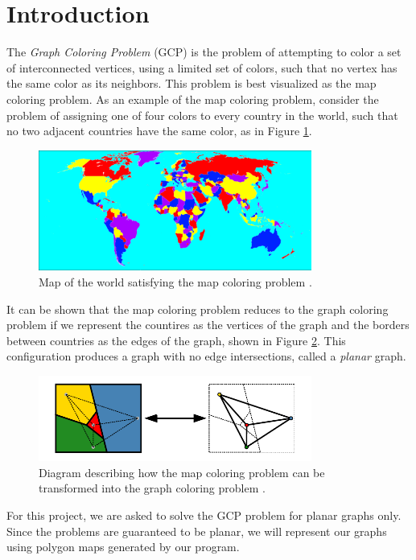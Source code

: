 \documentclass{article}
\begin{document}
\section{Introduction}
	The \textit{Graph Coloring Problem} (GCP) is the problem of attempting to color a set of interconnected vertices, using a limited set of colors, such that no vertex has the same color as its neighbors. This problem is best visualized as the map coloring problem. As an example of the map coloring problem, consider the problem of assigning one of four colors to every country in the world, such that no two adjacent countries have the same color, as in Figure \ref{world}. 
	\begin{figure}[h!]
		\centering
		\includegraphics[width=0.8\textwidth]{images/world_map}
		\caption{Map of the world satisfying the map coloring problem \cite{world}.}
		\label{world}
	\end{figure}
	It can be shown that the map coloring problem reduces to the graph coloring problem\cite{ai} if we represent the countires as the vertices of the graph and the borders between countries as the edges of the graph, shown in Figure \ref{four_col}. This configuration produces a graph with no edge intersections, called a \textit{planar} graph. 	
	\begin{figure}[h!]
		\centering
		\includegraphics[width=0.8\textwidth]{images/four_color}
		\caption{Diagram describing how the map coloring problem can be transformed into the graph coloring problem \cite{four_color}.}
		\label{four_col}
	\end{figure}
	For this project, we are asked to solve the GCP problem for planar graphs only. Since the problems are guaranteed to be planar, we will represent our graphs using polygon maps generated by our program.
	
\end{document}
